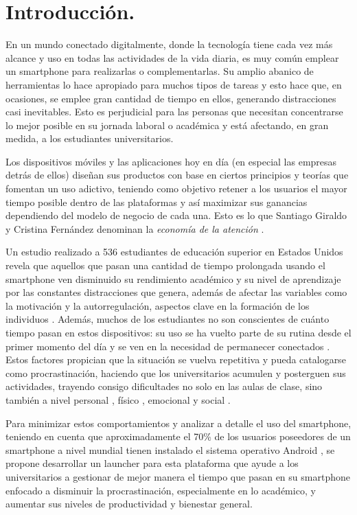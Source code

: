 \section*{Introducción.}
En un mundo conectado digitalmente, donde la tecnología tiene cada vez más alcance y uso en todas las actividades de la vida diaria, es muy común emplear un smartphone para realizarlas o complementarlas. Su amplio abanico de herramientas lo hace apropiado para muchos tipos de tareas y esto hace que, en ocasiones, se emplee gran cantidad de tiempo en ellos, generando distracciones casi inevitables. Esto es perjudicial para las personas que necesitan concentrarse lo mejor posible en su jornada laboral o académica y está afectando, en gran medida, a los estudiantes universitarios.

Los dispositivos móviles y las aplicaciones hoy en día (en especial las empresas detrás de ellos) diseñan sus productos con base en ciertos principios y teorías que fomentan un uso adictivo, teniendo como objetivo retener a los usuarios el mayor tiempo posible dentro de las plataformas \cite{Montag2019} y así maximizar sus ganancias dependiendo del modelo de negocio de cada una. Esto es lo que Santiago Giraldo y Cristina Fernández denominan la \textit{economía de la atención} \cite{Giraldo2020}.

Un estudio realizado a 536 estudiantes de educación superior en Estados Unidos revela que aquellos que pasan una cantidad de tiempo prolongada usando el smartphone ven disminuido su rendimiento académico y su nivel de aprendizaje por las constantes distracciones que genera, además de afectar las variables como la motivación y la autorregulación, aspectos clave en la formación de los individuos \cite{Lepp2015}. Además, muchos de los estudiantes no son conscientes de cuánto tiempo pasan en estos dispositivos: su uso se ha vuelto parte de su rutina desde el primer momento del día y se ven en la necesidad de permanecer conectados \cite{Giraldo2020}. Estos factores propician que la situación se vuelva repetitiva y pueda catalogarse como procrastinación, haciendo que los universitarios acumulen y posterguen sus actividades, trayendo consigo dificultades no solo en las aulas de clase, sino también a nivel personal \cite{Kus2016}, físico \cite{Grewal2020,Puerto2015}, emocional y social \cite{Beutel2016}. 

Para minimizar estos comportamientos y analizar a detalle el uso del smartphone, teniendo en cuenta que aproximadamente el 70\% de los usuarios poseedores de un smartphone a nivel mundial tienen instalado el sistema operativo Android \cite{AndroidUsers2024}, se propone desarrollar un launcher para esta plataforma que ayude a los universitarios a gestionar de mejor manera el tiempo que pasan en su smartphone enfocado a disminuir la procrastinación, especialmente en lo académico, y aumentar sus niveles de productividad y bienestar general.


